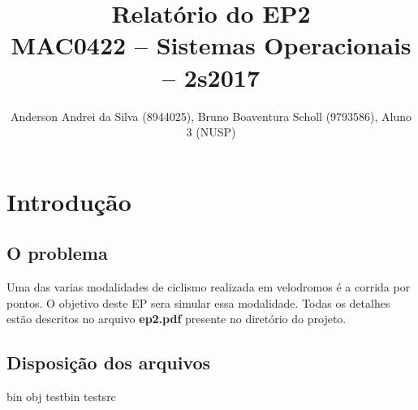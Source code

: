 \documentclass[12pt,a4paper]{article}
\title{Relatório do EP2\\MAC0422 -- Sistemas Operacionais -- 2s2017}
\author{Anderson Andrei da Silva (8944025), Bruno Boaventura Scholl (9793586), Aluno 3 (NUSP)}
\date{}
\begin{document}
\maketitle

\section{Introdução}

\subsection{O problema}

      Uma das varias modalidades de ciclismo realizada em velodromos é a corrida por pontos. O objetivo deste EP sera simular essa modalidade. Todas os detalhes estão descritos no arquivo \textbf{ep2.pdf} presente no diretório do projeto.

\subsection{Disposição dos arquivos} 
    
    bin  obj testbin  testsrc
\end{document}
